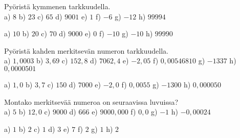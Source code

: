 
\begin{tehtava}
Pyöristä kymmenen tarkkuudella. \\
a) $8$ \qquad
b) $23$ \qquad
c) $65$ \qquad
d) $9001$ \qquad
e) $1$ \qquad
f) $-6$ \qquad
g) $-12$ \qquad
h) $99994$
\begin{vastaus}
a) $10$ \qquad
b) $20$ \qquad
c) $70$ \qquad
d) $9000$ \qquad
e) $0$ \qquad
f) $-10$ \qquad
g) $-10$ \qquad
h) $99990$
\end{vastaus}
\end{tehtava}

\begin{tehtava}
Pyöristä kahden merkitsevän numeron tarkkuudella. \\
a) $1,0003$ \qquad
b) $3,69$ \qquad
c) $152,8$ \qquad
d) $7062,4$ \qquad
e) $-2,05$ \qquad
f) $0,00546810$ \qquad
g) $-1337$ \qquad
h) $0,0000501$
\begin{vastaus}
a) $1,0$ \qquad
b) $3,7$ \qquad
c) $150$ \qquad
d) $7000$ \qquad
e) $-2,0$ \qquad
f) $0,0055$ \qquad
g) $-1300$ \qquad
h) $0,000050$
\end{vastaus}
\end{tehtava}

\begin{tehtava}
Montako merkitsevää numeroa on seuraavissa luvuissa? \\
a) $5$ \qquad
b) $12,0$ \qquad
c) $9000$ \qquad
d) $666$ \qquad
e) $9000,000$ \qquad
f) $0,0$ \qquad
g) $-1$ \qquad
h) $-0,00024$
\begin{vastaus}
a) $1$ \qquad
b) $2$ \qquad
c) $1$ \qquad
d) $3$ \qquad
e) $7$ \qquad
f) $2$ \qquad
g) $1$ \qquad
h) $2$
\end{vastaus}
\end{tehtava}
